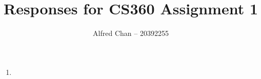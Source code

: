 \documentclass[12pt]{article}
\title{Responses for CS360 Assignment 1}
\author{Alfred Chan -- 20392255}
\begin{document}
\maketitle

\begin{enumerate}
\item \done
\end{enumerate}
\end{document}
